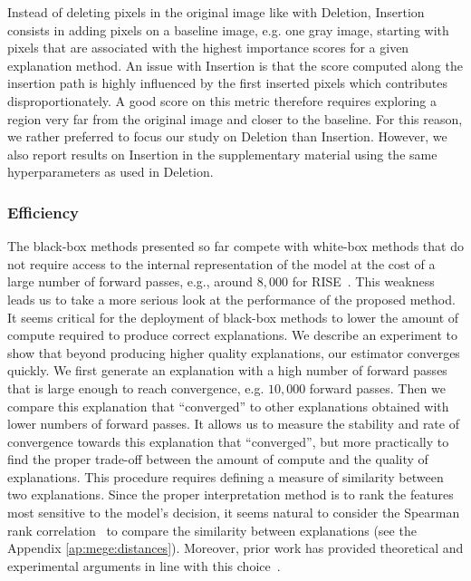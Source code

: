 Instead of deleting pixels in the original image like with Deletion, Insertion consists in adding pixels on a baseline image, e.g. one gray image, starting with pixels that are associated with the highest importance scores for a given explanation method.
An issue with Insertion is that the score computed along the insertion path is highly influenced by the first inserted pixels which contributes disproportionately. A good score on this metric therefore requires exploring a region very far from the original image and closer to the baseline. For this reason, we rather preferred to focus our study on Deletion than Insertion. However, we also report results on Insertion in the supplementary material using the same hyperparameters as used in Deletion.

\subsubsection{Efficiency}
\label{sec:sobol:efficient}

The black-box methods presented so far compete with white-box methods that do not require access to the internal representation of the model at the cost of a large number of forward passes, e.g., around $8,000$ for RISE~\cite{petsiuk2018rise}. This weakness leads us to take a more serious look at the performance of the proposed method.
It seems critical for the deployment of black-box methods to lower the amount of compute required to produce correct explanations.
We describe an experiment to show that beyond producing higher quality explanations, our estimator converges quickly.
We first generate an explanation with a high number of forward passes that is large enough to reach convergence, e.g. $10,000$ forward passes. Then we compare this explanation that ``converged'' to other explanations obtained with lower numbers of forward passes. It allows us to measure the stability and rate of convergence towards this explanation that ``converged'', but more practically to find the proper trade-off between the amount of compute and the quality of explanations.
This procedure requires defining a measure of similarity between two explanations.
Since the proper interpretation method is to rank the features most sensitive to the model's decision, it seems natural to consider the  Spearman rank correlation~\cite{spearman1904measure} to compare the similarity between explanations (see the Appendix \autoref{ap:mege:distances}). Moreover, prior work has provided theoretical and experimental arguments in line with this choice~\cite{ ghorbani2017interpretation, adebayo2018sanity, tomsett2019sanity}.

